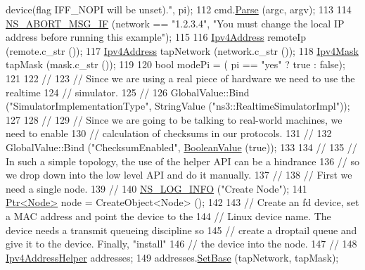 \begin{DoxyCode}
{       device(flag IFF\_NOPI will be unset)."}, pi);
112   cmd.\hyperlink{classns3_1_1CommandLine_a5c10b85b3207e5ecb48d907966923156}{Parse} (argc, argv);
113 
114   \hyperlink{group__fatal_ga6653324225bc139e46deea177614ceee}{NS\_ABORT\_MSG\_IF} (network == \textcolor{stringliteral}{"1.2.3.4"}, \textcolor{stringliteral}{"You must change the local IP address before
       running this example"});
115 
116   \hyperlink{classns3_1_1Ipv4Address}{Ipv4Address} remoteIp (remote.c\_str ());
117   \hyperlink{classns3_1_1Ipv4Address}{Ipv4Address} tapNetwork (network.c\_str ());
118   \hyperlink{classns3_1_1Ipv4Mask}{Ipv4Mask} tapMask (mask.c\_str ());
119 
120   \textcolor{keywordtype}{bool} modePi = ( pi == \textcolor{stringliteral}{"yes"} ? \textcolor{keyword}{true} : \textcolor{keyword}{false});
121 
122   \textcolor{comment}{//}
123   \textcolor{comment}{// Since we are using a real piece of hardware we need to use the realtime}
124   \textcolor{comment}{// simulator.}
125   \textcolor{comment}{//}
126   GlobalValue::Bind (\textcolor{stringliteral}{"SimulatorImplementationType"}, StringValue (\textcolor{stringliteral}{"ns3::RealtimeSimulatorImpl"}));
127 
128   \textcolor{comment}{//}
129   \textcolor{comment}{// Since we are going to be talking to real-world machines, we need to enable}
130   \textcolor{comment}{// calculation of checksums in our protocols.}
131   \textcolor{comment}{//}
132   GlobalValue::Bind (\textcolor{stringliteral}{"ChecksumEnabled"}, \hyperlink{classns3_1_1BooleanValue}{BooleanValue} (\textcolor{keyword}{true}));
133 
134   \textcolor{comment}{//}
135   \textcolor{comment}{// In such a simple topology, the use of the helper API can be a hindrance}
136   \textcolor{comment}{// so we drop down into the low level API and do it manually.}
137   \textcolor{comment}{//}
138   \textcolor{comment}{// First we need a single node.}
139   \textcolor{comment}{//}
140   \hyperlink{group__logging_gafbd73ee2cf9f26b319f49086d8e860fb}{NS\_LOG\_INFO} (\textcolor{stringliteral}{"Create Node"});
141   \hyperlink{classns3_1_1Ptr}{Ptr<Node>} node = CreateObject<Node> ();
142 
143   \textcolor{comment}{// Create an fd device, set a MAC address and point the device to the}
144   \textcolor{comment}{// Linux device name.  The device needs a transmit queueing discipline so}
145   \textcolor{comment}{// create a droptail queue and give it to the device.  Finally, "install"}
146   \textcolor{comment}{// the device into the node.}
147   \textcolor{comment}{//}
148   \hyperlink{classns3_1_1Ipv4AddressHelper}{Ipv4AddressHelper} addresses;
149   addresses.\hyperlink{classns3_1_1Ipv4AddressHelper_acf7b16dd25bac67e00f5e25f90a9a035}{SetBase} (tapNetwork, tapMask);

\end{DoxyCode}
